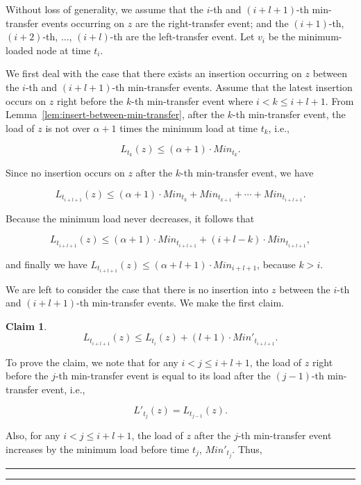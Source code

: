 \documentclass[a4paper]{article}
\newtheorem{claim}{Claim}
\newenvironment{proof}{{\bf Proof:}}{\hfill\rule{1.5mm}{3mm}\vspace{0.1in}}
\begin{document}
\begin{proof}
  Without loss of generality, we assume that the $i$-th and 
  $(i+l+1)$-th min-transfer events occurring on $z$ are the
  right-transfer event; and the $(i+1)$-th, $(i+2)$-th, ...,
  $(i+l)$-th are the left-transfer event.  Let $v_{i}$ be the
  minimum-loaded node at time $t_i$.

  We first deal with the case that there exists an insertion occurring
  on $z$ between the $i$-th and  $(i+l+1)$-th min-transfer events.
  Assume that the latest insertion occurs on $z$ right before the
  $k$-th min-transfer event where $i< k\leq i+l+1$. From
  Lemma~\ref{lem:insert-between-min-transfer}, after the $k$-th
  min-transfer event, the load of $z$ is not over $\alpha +1$ times 
  the minimum load at time $t_k$, i.e.,
	
  \[
  L_{t_k}(z)\leq (\alpha+1)\cdot Min_{t_k}.
  \]

  Since no insertion occurs on $z$ after the $k$-th min-transfer
  event, we have 
	
  \[
  L_{t_{i+l+1}}(z)\leq (\alpha+1)\cdot Min_{t_k} + Min_{t_{k+1}}
  +\cdots + Min_{t_{i+l+1}}.
  \]
	
  Because the minimum load never decreases, it follows that
	
  \[
  L_{t_{i+l+1}}(z) \leq (\alpha+1)\cdot Min_{t_{i+l+1}} + (i+l-k)\cdot
  Min_{t_{i+l+1}},
  \]

  and finally we have $L_{t_{i+l+1}}(z)\leq (\alpha+l+1)\cdot
  Min_{i+l+1}$, because $k> i$.
		
  We are left to consider the case that there is no insertion into $z$
  between the $i$-th and  $(i+l+1)$-th min-transfer events.  We
  make the first claim.
    
  \begin{claim}\label{clamin:1}
  \[
  L_{t_{i+l+1}}(z) \leq L_{t_{i}}(z) + (l+1)\cdot Min'_{t_{i+l+1}}.
  \]
\end{claim}
\begin{proof}
  To prove the claim, we note that for any $i< j\leq i+l+1$, the load
  of $z$ right before the $j$-th min-transfer event is equal to its
  load after the $(j-1)$-th min-transfer event, i.e.,

  \begin{equation}\label{eqn:l'_l}
    L'_{t_j}(z)=L_{t_{j-1}}(z).
  \end{equation}  

  Also, for any $i< j\leq i+l+1$, the load of $z$ after the
  $j$-th min-transfer event increases by the minimum load before time
  $t_j$, $Min'_{t_j}$.  Thus,


\end{proof}
\end{proof}
\end{document}
